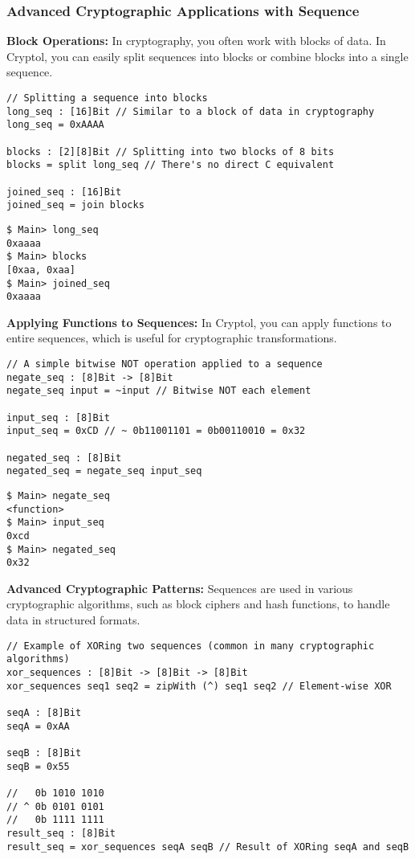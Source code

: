 \newpage
\subsubsection{Advanced Cryptographic Applications with Sequence}
\textbf{Block Operations:} In cryptography, you often work with blocks of data. In Cryptol, you can easily split sequences into blocks or combine blocks into a single sequence.
\begin{lstlisting}[style=cryptol]
// Splitting a sequence into blocks
long_seq : [16]Bit // Similar to a block of data in cryptography
long_seq = 0xAAAA

blocks : [2][8]Bit // Splitting into two blocks of 8 bits
blocks = split long_seq // There's no direct C equivalent

joined_seq : [16]Bit
joined_seq = join blocks
\end{lstlisting}
\begin{lstlisting}[style=zsh]
$ Main> long_seq
0xaaaa
$ Main> blocks
[0xaa, 0xaa]
$ Main> joined_seq
0xaaaa
\end{lstlisting}
\vspace{16pt}
\textbf{Applying Functions to Sequences:} In Cryptol, you can apply functions to entire sequences, which is useful for cryptographic transformations.
\begin{lstlisting}[style=cryptol]
// A simple bitwise NOT operation applied to a sequence
negate_seq : [8]Bit -> [8]Bit
negate_seq input = ~input // Bitwise NOT each element

input_seq : [8]Bit
input_seq = 0xCD // ~ 0b11001101 = 0b00110010 = 0x32

negated_seq : [8]Bit
negated_seq = negate_seq input_seq
\end{lstlisting}
\begin{lstlisting}[style=zsh]
$ Main> negate_seq
<function>
$ Main> input_seq
0xcd
$ Main> negated_seq
0x32
\end{lstlisting}
\vspace{16pt}
\newpage
\noindent\textbf{Advanced Cryptographic Patterns:} Sequences are used in various cryptographic algorithms, such as block ciphers and hash functions, to handle data in structured formats.
\begin{lstlisting}[style=cryptol]
// Example of XORing two sequences (common in many cryptographic algorithms)
xor_sequences : [8]Bit -> [8]Bit -> [8]Bit
xor_sequences seq1 seq2 = zipWith (^) seq1 seq2 // Element-wise XOR

seqA : [8]Bit
seqA = 0xAA

seqB : [8]Bit
seqB = 0x55

//   0b 1010 1010
// ^ 0b 0101 0101
//   0b 1111 1111
result_seq : [8]Bit
result_seq = xor_sequences seqA seqB // Result of XORing seqA and seqB
\end{lstlisting}
